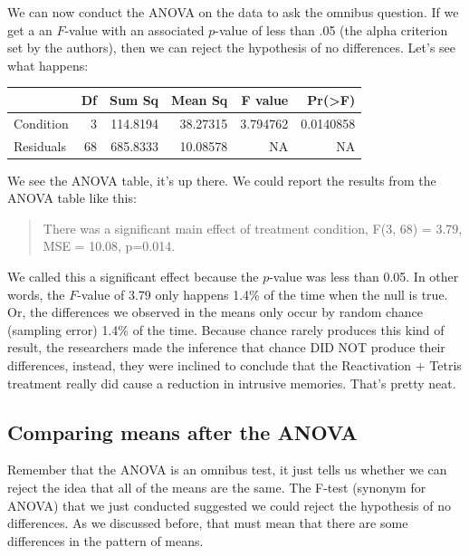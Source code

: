 \documentclass[
  letterpaper,
  DIV=11,
  numbers=noendperiod]{scrreprt}
\begin{document}
We can now conduct the ANOVA on the data to ask the omnibus question. If
we get a an \(F\)-value with an associated \(p\)-value of less than .05
(the alpha criterion set by the authors), then we can reject the
hypothesis of no differences. Let's see what happens:

\begin{longtable}[]{@{}lrrrrr@{}}
\toprule\noalign{}
& Df & Sum Sq & Mean Sq & F value & Pr(\textgreater F) \\
\midrule\noalign{}
\endhead
\bottomrule\noalign{}
\endlastfoot
Condition & 3 & 114.8194 & 38.27315 & 3.794762 & 0.0140858 \\
Residuals & 68 & 685.8333 & 10.08578 & NA & NA \\
\end{longtable}

We see the ANOVA table, it's up there. We could report the results from
the ANOVA table like this:

\begin{quote}
There was a significant main effect of treatment condition, F(3, 68) =
3.79, MSE = 10.08, p=0.014.
\end{quote}

We called this a significant effect because the \(p\)-value was less
than 0.05. In other words, the \(F\)-value of 3.79 only happens 1.4\% of
the time when the null is true. Or, the differences we observed in the
means only occur by random chance (sampling error) 1.4\% of the time.
Because chance rarely produces this kind of result, the researchers made
the inference that chance DID NOT produce their differences, instead,
they were inclined to conclude that the Reactivation + Tetris treatment
really did cause a reduction in intrusive memories. That's pretty neat.

\subsection{Comparing means after the
ANOVA}\label{comparing-means-after-the-anova}

Remember that the ANOVA is an omnibus test, it just tells us whether we
can reject the idea that all of the means are the same. The F-test
(synonym for ANOVA) that we just conducted suggested we could reject the
hypothesis of no differences. As we discussed before, that must mean
that there are some differences in the pattern of means.
\end{document}

